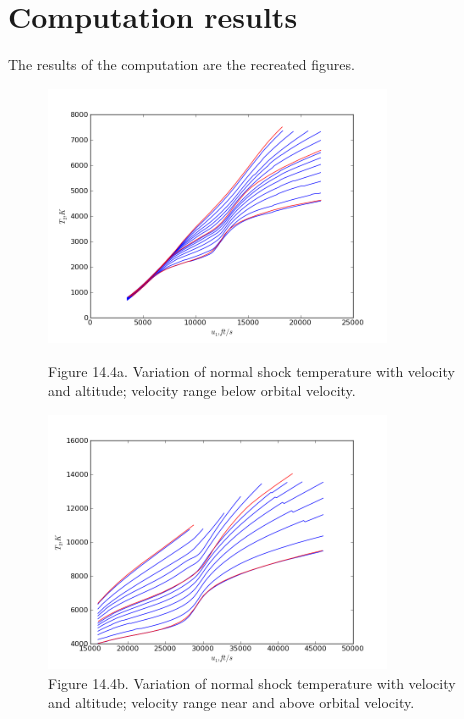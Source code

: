 \documentclass[9pt]{article}
\begin{document}
\section*{Computation results}
The results of the computation are the recreated figures.
\begin{figure}[!htbp]
\includegraphics[width=0.80\textwidth]{144a}
\caption{Figure 14.4a. Variation of normal shock temperature with velocity and altitude; velocity range below orbital velocity.}
\includegraphics[width=0.80\textwidth]{144b}
\caption{Figure 14.4b. Variation of normal shock temperature with velocity and altitude; velocity range near and above orbital velocity.}
\end{figure}
\end{document}
